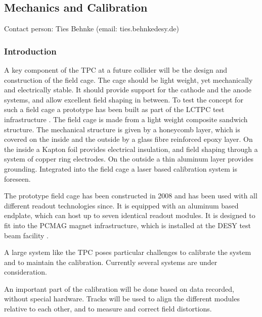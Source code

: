 \subsection{Mechanics and Calibration}\label{chap:TPC_sec:mechanics}
Contact person: Ties Behnke (email: ties.behnke\@ desy.de)\\

\subsubsection{Introduction}
A key component of the TPC at a future collider will be the design and construction of the field cage. The cage should be light weight, yet mechanically and electrically stable. It should provide support for the cathode and the anode systems, and allow excellent field shaping in between.
To test the concept for such a field cage a prototype has been built as part of the LCTPC test infrastructure \cite{1748-0221-5-10-P10011}. The field cage is made from a light weight composite sandwich structure. The mechanical structure is given by a honeycomb layer, which is covered on the inside and the outside by a glass fibre reinforced epoxy layer. On the inside a Kapton foil provides electrical insulation, and field shaping through a system of copper ring electrodes. On the outside a thin aluminum layer provides grounding. Integrated into the field cage a laser based calibration system is foreseen.

The prototype field cage has been constructed in 2008 and has been used with all different readout technologies since. It is equipped with an aluminum based endplate, which can host up to seven identical readout modules. It is designed to fit into the PCMAG magnet \cite{Yamamoto199475} infrastructure, which is installed at the DESY test beam facility \cite{DESY2TB}.


A large system like the TPC poses particular challenges to calibrate the system and to maintain the calibration. Currently several systems are under consideration.

An important part of the calibration will be done based on data recorded, without special hardware. Tracks will be used to align the different modules relative to each other, and to measure and correct field distortions.

